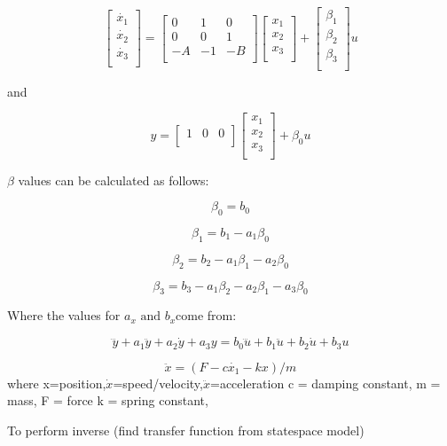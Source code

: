 \begin{multicols}{3}
\[\begin{bmatrix}
\dot{x_{1}} \\
\dot{x_{2}} \\
\dot{x_{3}} \\
\end{bmatrix} = \begin{bmatrix}
0 & 1 & 0 \\
0 & 0 & 1 \\
 - A & - 1 & - B \\
\end{bmatrix}\begin{bmatrix}
x_{1} \\
x_{2} \\
x_{3} \\
\end{bmatrix} + \begin{bmatrix}
\beta_{1} \\
\beta_{2} \\
\beta_{3} \\
\end{bmatrix}u\]

and

\[y = \begin{bmatrix}
1 & 0 & 0 \\
\end{bmatrix}\begin{bmatrix}
x_{1} \\
x_{2} \\
x_{3} \\
\end{bmatrix} + \beta_{0}u\]

\(\beta\) values can be calculated as follows:

\[\beta_{0} = b_{0}\]

\[\beta_{1} = b_{1} - a_{1}\beta_{0}\]

\[\beta_{2} = b_{2} - a_{1}\beta_{1} - a_{2}\beta_{0}\]

\[\beta_{3} = b_{3} - a_{1}\beta_{2} - a_{2}\beta_{1} - a_{3}\beta_{0}\]

Where the values for \(a_{x}\text{\ and\ }b_{x}\)come from:

\[\dddot{y} + a_{1}\ddot{y} + a_{2}\dot{y} + a_{3}y = b_{0}\dddot{u} + b_{1}\ddot{u} + b_{2}\dot{u} + b_{3}u\]


\[\ddot{x}=(F-c\dot{x_{1}}-kx)/m\]
where
	x=position,$\dot{x}$=speed/velocity,$\ddot{x}$=acceleration
	c = damping constant,
	m = mass,
	F = force
	k = spring constant,

To perform inverse (find transfer function from statespace model)


\end{multicols}

